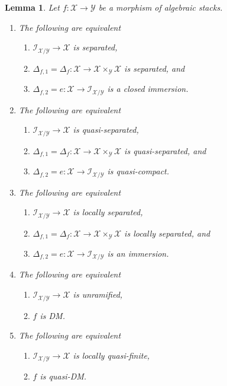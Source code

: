 \documentclass{stacks-project}
\theoremstyle{plain}
\newtheorem{lemma}[subsection]{Lemma}
\theoremstyle{definition}
\theoremstyle{remark}
\numberwithin{equation}{subsection}
\begin{document}
\begin{lemma}
\label{lemma-diagonal-diagonal}
Let $f : \mathcal{X} \to \mathcal{Y}$ be a morphism of algebraic stacks.
\begin{enumerate}
\item
The following are equivalent
\begin{enumerate}
\item $\mathcal{I}_{\mathcal{X}/\mathcal{Y}} \to \mathcal{X}$
is separated,
\item $\Delta_{f, 1} = \Delta_f :
\mathcal{X} \to \mathcal{X} \times_\mathcal{Y} \mathcal{X}$
is separated, and
\item $\Delta_{f, 2} = e :
\mathcal{X} \to \mathcal{I}_{\mathcal{X}/\mathcal{Y}}$
is a closed immersion.
\end{enumerate}
\item
The following are equivalent
\begin{enumerate}
\item $\mathcal{I}_{\mathcal{X}/\mathcal{Y}} \to \mathcal{X}$
is quasi-separated,
\item $\Delta_{f, 1} = \Delta_f :
\mathcal{X} \to \mathcal{X} \times_\mathcal{Y} \mathcal{X}$
is quasi-separated, and
\item $\Delta_{f, 2} = e :
\mathcal{X} \to \mathcal{I}_{\mathcal{X}/\mathcal{Y}}$
is quasi-compact.
\end{enumerate}
\item
The following are equivalent
\begin{enumerate}
\item $\mathcal{I}_{\mathcal{X}/\mathcal{Y}} \to \mathcal{X}$
is locally separated,
\item $\Delta_{f, 1} = \Delta_f :
\mathcal{X} \to \mathcal{X} \times_\mathcal{Y} \mathcal{X}$
is locally separated, and
\item $\Delta_{f, 2} = e :
\mathcal{X} \to \mathcal{I}_{\mathcal{X}/\mathcal{Y}}$
is an immersion.
\end{enumerate}
\item
The following are equivalent
\begin{enumerate}
\item $\mathcal{I}_{\mathcal{X}/\mathcal{Y}} \to \mathcal{X}$
is unramified,
\item $f$ is DM.
\end{enumerate}
\item
The following are equivalent
\begin{enumerate}
\item $\mathcal{I}_{\mathcal{X}/\mathcal{Y}} \to \mathcal{X}$
is locally quasi-finite,
\item $f$ is quasi-DM.
\end{enumerate}
\end{enumerate}
\end{lemma}
\end{document}
